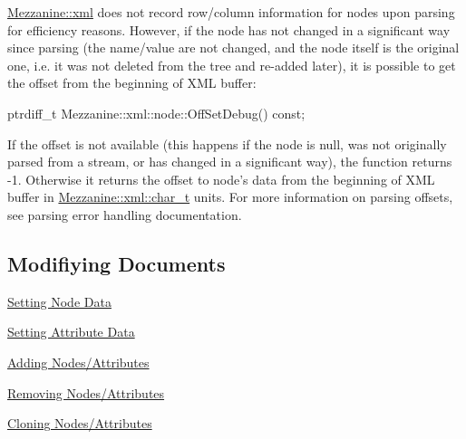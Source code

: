 \hyperlink{namespaceMezzanine_1_1xml}{Mezzanine::xml} does not record row/column information for nodes upon parsing for efficiency reasons. However, if the node has not changed in a significant way since parsing (the name/value are not changed, and the node itself is the original one, i.e. it was not deleted from the tree and re-\/added later), it is possible to get the offset from the beginning of XML buffer: 
\begin{DoxyCode}
 ptrdiff_t Mezzanine::xml::node::OffSetDebug() const;
\end{DoxyCode}
 If the offset is not available (this happens if the node is null, was not originally parsed from a stream, or has changed in a significant way), the function returns -\/1. Otherwise it returns the offset to node's data from the beginning of XML buffer in \hyperlink{namespaceMezzanine_1_1xml_a29b8a47c179e9895c4e9e66c45d1dbbc}{Mezzanine::xml::char\_\-t} units. For more information on parsing offsets, see parsing error handling documentation. \par
 \par
 \hypertarget{XMLManual_XMLModifying}{}\subsection{Modifiying Documents}\label{XMLManual_XMLModifying}

\begin{DoxyItemize}
\item \hyperlink{XMLManual_XMLModifyingNodeData}{Setting Node Data}
\item \hyperlink{XMLManual_XMLModifyingAttributeData}{Setting Attribute Data}
\item \hyperlink{XMLManual_XMLModifyingAdding}{Adding Nodes/Attributes}
\item \hyperlink{XMLManual_XMLModifyingRemoving}{Removing Nodes/Attributes}
\item \hyperlink{XMLManual_XMLModifyingCloning}{Cloning Nodes/Attributes}
\end{DoxyItemize}

